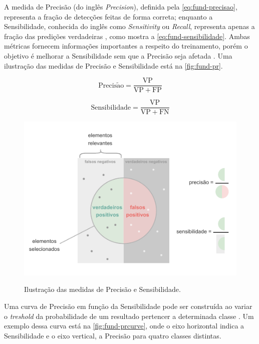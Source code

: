 A medida de Precisão (do inglês \textit{Precision}), definida pela \autoref{eq:fund-precisao}, representa a fração de detecções feitas de forma correta; enquanto a Sensibilidade, conhecida do inglês como \textit{Sensitivity} ou \textit{Recall}, representa apenas a fração das predições verdadeiras \cite{ref:Goodfellow-Bengio-Courville}, como mostra a \autoref{eq:fund-sensibilidade}. Ambas métricas fornecem informações importantes a respeito do treinamento, porém o objetivo é melhorar a Sensibilidade sem que a Precisão seja afetada . Uma ilustração das medidas de Precisão e Sensibilidade está na \autoref{fig:fund-pr}.

\begin{equation} \label{eq:fund-precisao}
\mathrm{
  Precis\tilde{a}o = \frac{VP}{VP + FP}
}
\end{equation}

\begin{equation} \label{eq:fund-sensibilidade}
\mathrm{
  Sensibilidade = \frac{VP}{VP + FN}
}
\end{equation}

\begin{figure}[h!] %
  \centering
  \caption{Ilustração das medidas de Precisão e Sensibilidade.}
  \includegraphics[scale=1.7]{img/img-fundamentacao-pr.pdf}
  \label{fig:fund-pr}
\end{figure}

Uma curva de Precisão em função da Sensibilidade pode ser construída ao variar o \textit{treshold} da probabilidade de um resultado pertencer a determinada classe \cite{ref:Steen}. Um exemplo dessa curva está na \autoref{fig:fund-prcurve}, onde o eixo horizontal indica a Sensibilidade e o eixo vertical, a Precisão para quatro classes distintas.

